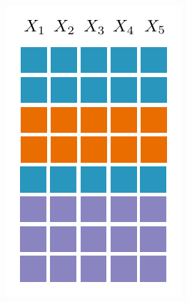 \documentclass[final]{beamer}
\begin{document}
\begin{frame}{}
\begin{textblock}{25.7}
\begin{minipage}[t]{5.54cm}
      \includegraphics[width=\linewidth]{figures/grid-1}
    \end{minipage}
\end{textblock}
\end{frame}
\end{document}
